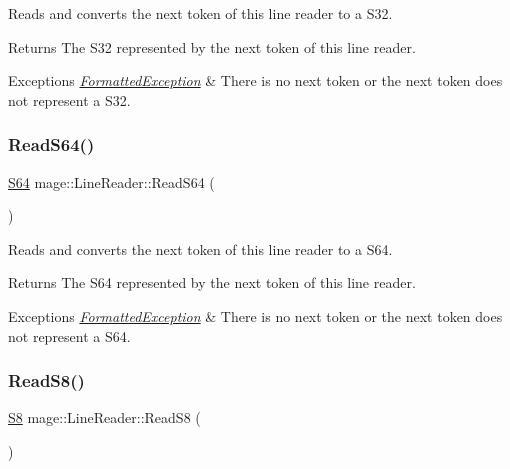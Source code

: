 Reads and converts the next token of this line reader to a {\ttfamily S32}.

\begin{DoxyReturn}{Returns}
The {\ttfamily S32} represented by the next token of this line reader. 
\end{DoxyReturn}

\begin{DoxyExceptions}{Exceptions}
{\em \hyperlink{classmage_1_1_formatted_exception}{Formatted\+Exception}} & There is no next token or the next token does not represent a {\ttfamily S32}. \\
\hline
\end{DoxyExceptions}
\hypertarget{classmage_1_1_line_reader_a8eec39fc74b8708033aa2b937bf4b785}{}\label{classmage_1_1_line_reader_a8eec39fc74b8708033aa2b937bf4b785} 
\subsubsection{\texorpdfstring{Read\+S64()}{ReadS64()}}
{\footnotesize\ttfamily \hyperlink{namespacemage_a38d4d411c173c8978eb356d2412b32dd}{S64} mage\+::\+Line\+Reader\+::\+Read\+S64 (\begin{DoxyParamCaption}{ }\end{DoxyParamCaption})\hspace{0.3cm}{\ttfamily [protected]}}

Reads and converts the next token of this line reader to a {\ttfamily S64}.

\begin{DoxyReturn}{Returns}
The {\ttfamily S64} represented by the next token of this line reader. 
\end{DoxyReturn}

\begin{DoxyExceptions}{Exceptions}
{\em \hyperlink{classmage_1_1_formatted_exception}{Formatted\+Exception}} & There is no next token or the next token does not represent a {\ttfamily S64}. \\
\hline
\end{DoxyExceptions}
\hypertarget{classmage_1_1_line_reader_a39a5e24bb2b416c56a98cabd93efcc73}{}\label{classmage_1_1_line_reader_a39a5e24bb2b416c56a98cabd93efcc73} 
\subsubsection{\texorpdfstring{Read\+S8()}{ReadS8()}}
{\footnotesize\ttfamily \hyperlink{namespacemage_a20766a773cfd6c14d8f2344d4631b89c}{S8} mage\+::\+Line\+Reader\+::\+Read\+S8 (\begin{DoxyParamCaption}{ }\end{DoxyParamCaption})\hspace{0.3cm}{\ttfamily [protected]}}

